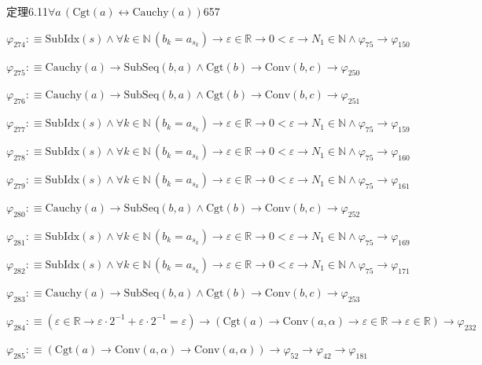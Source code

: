\begin{fullproof}{定理6.11}{$\forall a\,(\mathrm{Cgt}(a) \leftrightarrow \mathrm{Cauchy}(a))$}{657}
\begin{abbrevlist}
\item $\varphi_{274} :\equiv \mathrm{SubIdx}(s) \land \forall k \in \mathbb{N}\,(b_{k} = a_{s_{k}}) \to \varepsilon \in \mathbb{R} \to 0 < \varepsilon \to N_{1} \in \mathbb{N} \land \varphi_{75} \to \varphi_{150}$
\item $\varphi_{275} :\equiv \mathrm{Cauchy}(a) \to \mathrm{SubSeq}(b,a) \land \mathrm{Cgt}(b) \to \mathrm{Conv}(b,c) \to \varphi_{250}$
\item $\varphi_{276} :\equiv \mathrm{Cauchy}(a) \to \mathrm{SubSeq}(b,a) \land \mathrm{Cgt}(b) \to \mathrm{Conv}(b,c) \to \varphi_{251}$
\item $\varphi_{277} :\equiv \mathrm{SubIdx}(s) \land \forall k \in \mathbb{N}\,(b_{k} = a_{s_{k}}) \to \varepsilon \in \mathbb{R} \to 0 < \varepsilon \to N_{1} \in \mathbb{N} \land \varphi_{75} \to \varphi_{159}$
\item $\varphi_{278} :\equiv \mathrm{SubIdx}(s) \land \forall k \in \mathbb{N}\,(b_{k} = a_{s_{k}}) \to \varepsilon \in \mathbb{R} \to 0 < \varepsilon \to N_{1} \in \mathbb{N} \land \varphi_{75} \to \varphi_{160}$
\item $\varphi_{279} :\equiv \mathrm{SubIdx}(s) \land \forall k \in \mathbb{N}\,(b_{k} = a_{s_{k}}) \to \varepsilon \in \mathbb{R} \to 0 < \varepsilon \to N_{1} \in \mathbb{N} \land \varphi_{75} \to \varphi_{161}$
\item $\varphi_{280} :\equiv \mathrm{Cauchy}(a) \to \mathrm{SubSeq}(b,a) \land \mathrm{Cgt}(b) \to \mathrm{Conv}(b,c) \to \varphi_{252}$
\item $\varphi_{281} :\equiv \mathrm{SubIdx}(s) \land \forall k \in \mathbb{N}\,(b_{k} = a_{s_{k}}) \to \varepsilon \in \mathbb{R} \to 0 < \varepsilon \to N_{1} \in \mathbb{N} \land \varphi_{75} \to \varphi_{169}$
\item $\varphi_{282} :\equiv \mathrm{SubIdx}(s) \land \forall k \in \mathbb{N}\,(b_{k} = a_{s_{k}}) \to \varepsilon \in \mathbb{R} \to 0 < \varepsilon \to N_{1} \in \mathbb{N} \land \varphi_{75} \to \varphi_{171}$
\item $\varphi_{283} :\equiv \mathrm{Cauchy}(a) \to \mathrm{SubSeq}(b,a) \land \mathrm{Cgt}(b) \to \mathrm{Conv}(b,c) \to \varphi_{253}$
\item $\varphi_{284} :\equiv (\varepsilon \in \mathbb{R} \to \varepsilon \cdot 2^{-1} + \varepsilon \cdot 2^{-1} = \varepsilon) \to (\mathrm{Cgt}(a) \to \mathrm{Conv}(a,\alpha) \to \varepsilon \in \mathbb{R} \to \varepsilon \in \mathbb{R}) \to \varphi_{232}$
\item $\varphi_{285} :\equiv (\mathrm{Cgt}(a) \to \mathrm{Conv}(a,\alpha) \to \mathrm{Conv}(a,\alpha)) \to \varphi_{52} \to \varphi_{42} \to \varphi_{181}$

\end{abbrevlist}
\end{fullproof}
